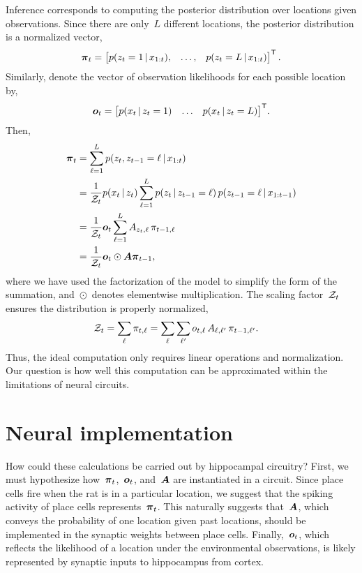 Inference corresponds to computing the posterior distribution over 
locations given 
observations. Since there are only~$L$ different locations, the posterior distribution is a 
normalized vector,
\begin{align}
\boldsymbol{\pi}_t = \begin{bmatrix} p(z_t=1 \,|\, x_{1:t}), & \ldots, & p(z_t=L \,|\, x_{1:t}) \end{bmatrix}^{\mathsf{T}}.
\end{align}
Similarly, denote the vector of observation likelihoods for each possible location by,
\begin{align}
{\boldsymbol{o}_t = \begin{bmatrix} p(x_t \,|\,z_t=1) & \ldots & p(x_t \,|\,z_t=L) \end{bmatrix}^{\mathsf{T}}}.
\end{align}
Then, 
\begin{align}
  \boldsymbol{\pi}_t 
  &= \sum_{\ell=1}^L p(z_{t}, z_{t-1} = \ell \,|\, x_{1:t}) \\
  &= \frac{1}{\mathcal{Z}_t} p(x_t \,|\, z_t) \sum_{\ell=1}^L p(z_{t} \,|\, z_{t-1} = \ell) \, p(z_{t-1}=\ell \,|\, x_{1:t-1}) \\
  &= \frac{1}{\mathcal{Z}_t} \boldsymbol{o}_t \sum_{\ell=1}^L A_{z_t, \ell} \, \pi_{t-1, \ell} \\
  \label{eq:inf_calc}
  &= \frac{1}{\mathcal{Z}_t} \boldsymbol{o}_t \odot \boldsymbol{A} \boldsymbol{\pi}_{t-1},
\end{align} 
where we have used the factorization of the model to simplify the form
of the summation, and~$\odot$~denotes elementwise
multiplication. The scaling factor~$\mathcal{Z}_t$ ensures the distribution is 
properly normalized,
\begin{align}
\mathcal{Z}_t &= \sum_{\ell} \pi_{t,\ell} = \sum_{\ell} \sum_{\ell'} o_{t,\ell} \, A_{\ell, \ell'} \, \pi_{t-1, \ell'}.
\end{align}
Thus, the ideal computation only requires linear
operations and normalization. 
Our question is how well this computation can be
approximated within the limitations of neural circuits.


\section{Neural implementation} How could these calculations be 
carried out by hippocampal circuitry? First, we must hypothesize 
how~$\boldsymbol{\pi}_t$,~$\boldsymbol{o}_t$, and~$\boldsymbol{A}$ are instantiated in a circuit. 
Since place cells fire when the rat is in a particular location, 
we suggest that the spiking activity of place cells represents~$\boldsymbol{\pi}_t$.
This naturally suggests that~$\boldsymbol{A}$, which conveys the probability of 
one location given past locations, should be implemented in the 
synaptic weights between place cells. Finally,~$\boldsymbol{o}_t$, which 
reflects the likelihood of a location under the environmental observations, 
is likely represented by synaptic inputs to hippocampus from cortex.

